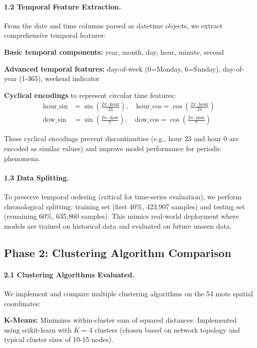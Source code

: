 \documentclass[12pt,a4paper]{article}
\begin{document}
\paragraph{1.2 Temporal Feature Extraction.}
From the date and time columns parsed as datetime objects, we extract comprehensive temporal features:

\textbf{Basic temporal components:} year, month, day, hour, minute, second

\textbf{Advanced temporal features:} day-of-week (0=Monday, 6=Sunday), day-of-year (1-365), weekend indicator

\textbf{Cyclical encodings} to represent circular time features:
\begin{align*}
    \text{hour\_sin} &= \sin\left(\frac{2\pi \cdot \text{hour}}{24}\right), \quad
    \text{hour\_cos} = \cos\left(\frac{2\pi \cdot \text{hour}}{24}\right) \\
    \text{dow\_sin} &= \sin\left(\frac{2\pi \cdot \text{dow}}{7}\right), \quad
    \text{dow\_cos} = \cos\left(\frac{2\pi \cdot \text{dow}}{7}\right)
\end{align*}

These cyclical encodings prevent discontinuities (e.g., hour 23 and hour 0 are encoded as similar values) and improve model performance for periodic phenomena.

\paragraph{1.3 Data Splitting.}
To preserve temporal ordering (critical for time-series evaluation), we perform chronological splitting: training set (first 40\%, 423,907 samples) and testing set (remaining 60\%, 635,860 samples). This mimics real-world deployment where models are trained on historical data and evaluated on future unseen data.

\subsection{Phase 2: Clustering Algorithm Comparison}

\paragraph{2.1 Clustering Algorithms Evaluated.}
We implement and compare multiple clustering algorithms on the 54 mote spatial coordinates:

\textbf{K-Means:} Minimizes within-cluster sum of squared distances. Implemented using scikit-learn with $K=4$ clusters (chosen based on network topology and typical cluster sizes of 10-15 nodes).
\end{document}
